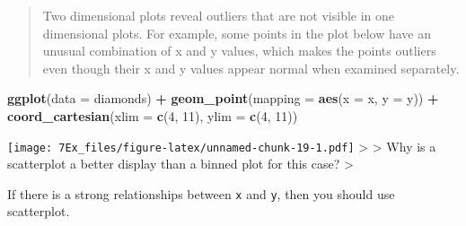 \documentclass[]{article}
\newenvironment{Shaded}{\begin{snugshade}}{\end{snugshade}}
\newcommand{\DataTypeTok}[1]{\textcolor[rgb]{0.13,0.29,0.53}{#1}}
\newcommand{\DecValTok}[1]{\textcolor[rgb]{0.00,0.00,0.81}{#1}}
\newcommand{\KeywordTok}[1]{\textcolor[rgb]{0.13,0.29,0.53}{\textbf{#1}}}
\newcommand{\NormalTok}[1]{#1}
\newcommand{\OperatorTok}[1]{\textcolor[rgb]{0.81,0.36,0.00}{\textbf{#1}}}
\newcommand{\StringTok}[1]{\textcolor[rgb]{0.31,0.60,0.02}{#1}}
\begin{document}
\begin{quote}
Two dimensional plots reveal outliers that are not visible in one
dimensional plots. For example, some points in the plot below have an
unusual combination of x and y values, which makes the points outliers
even though their x and y values appear normal when examined separately.
\end{quote}

\begin{Shaded}
\begin{Highlighting}[]
\KeywordTok{ggplot}\NormalTok{(}\DataTypeTok{data =}\NormalTok{ diamonds) }\OperatorTok{+}
\StringTok{  }\KeywordTok{geom_point}\NormalTok{(}\DataTypeTok{mapping =} \KeywordTok{aes}\NormalTok{(}\DataTypeTok{x =}\NormalTok{ x, }\DataTypeTok{y =}\NormalTok{ y)) }\OperatorTok{+}
\StringTok{  }\KeywordTok{coord_cartesian}\NormalTok{(}\DataTypeTok{xlim =} \KeywordTok{c}\NormalTok{(}\DecValTok{4}\NormalTok{, }\DecValTok{11}\NormalTok{), }\DataTypeTok{ylim =} \KeywordTok{c}\NormalTok{(}\DecValTok{4}\NormalTok{, }\DecValTok{11}\NormalTok{))}
\end{Highlighting}
\end{Shaded}

\texttt{[image: 7Ex\_files/figure-latex/unnamed-chunk-19-1.pdf]}
\textgreater{} \textgreater{} Why is a scatterplot a better display than
a binned plot for this case? \textgreater{}

If there is a strong relationships between \texttt{x} and \texttt{y},
then you should use scatterplot.
\end{document}
